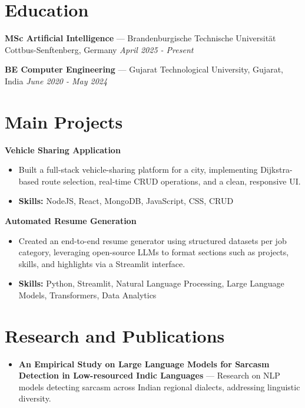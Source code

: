 \documentclass[a4paper,10pt]{article}
\begin{document}
\section*{Education}
\textbf{MSc Artificial Intelligence} — Brandenburgische Technische Universität Cottbus-Senftenberg, Germany \hfill \textit{April 2025 - Present}\par
\vspace{1.5pt}
\textbf{BE Computer Engineering} — Gujarat Technological University, Gujarat, India \hfill \textit{June 2020 - May 2024}\par

\section*{Main Projects}
\textbf{Vehicle Sharing Application}\par
\vspace{1pt}
\begin{itemize}
  \item Built a full-stack vehicle-sharing platform for a city, implementing Dijkstra-based route selection, real-time CRUD operations, and a clean, responsive UI.
  \item \textbf{Skills:} NodeJS, React, MongoDB, JavaScript, CSS, CRUD
\end{itemize}
\vspace{3pt}
\textbf{Automated Resume Generation}\par
\vspace{1pt}
\begin{itemize}
  \item Created an end-to-end resume generator using structured datasets per job category, leveraging open-source LLMs to format sections such as projects, skills, and highlights via a Streamlit interface.
  \item \textbf{Skills:} Python, Streamlit, Natural Language Processing, Large Language Models, Transformers, Data Analytics
\end{itemize}

\section*{Research and Publications}
\begin{itemize}
\item \textbf{An Empirical Study on Large Language Models for Sarcasm Detection in Low-resourced Indic Languages} — Research on NLP models detecting sarcasm across Indian regional dialects, addressing linguistic diversity.
\end{itemize}
\end{document}
